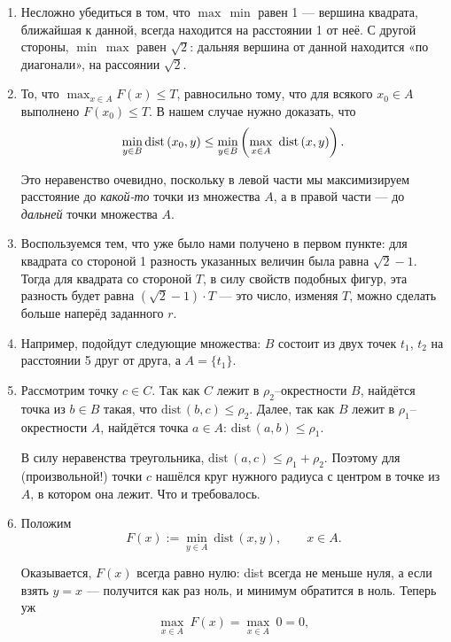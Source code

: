 \def\dist{\mathrm{dist}\,} \def\l#1{\limits_{#1}}
\def\Dist{\mathrm{DIST}\,}

\begin{enumerate}

\item Несложно убедиться в том, что $\max\,\min$ равен 1 — вершина квадрата, ближайшая к данной, всегда находится на расстоянии 1 от неё. С другой стороны, $\min\,\max$ равен $\sqrt{2}$: дальняя вершина от данной находится «по диагонали», на рассоянии $\sqrt{2}$.

\item То, что $\max_{x \in A} F(x) \le T$, равносильно тому, что для всякого $x_0 \in A$ выполнено $F(x_0) \le T$. В нашем случае нужно доказать, что
$$\min\l{y \in B} \dist(x_0,y) \le \min\l{y \in B}
	\ll \max\l{x \in A}\ \dist (x,y) \rr.$$

Это неравенство очевидно, поскольку в левой части мы максимизируем расстояние до {\itshape какой-то} точки из множества $A$, а в правой части — до {\itshape дальней} точки множества $A$.

\item Воспользуемся тем, что уже было нами получено в первом пункте: для квадрата со стороной 1 разность указанных величин была равна $\sqrt 2 -1$. Тогда для квадрата со стороной $T$, в силу свойств подобных фигур, эта разность будет равна $(\sqrt 2 -1) \cdot T$ — это число, изменяя $T$, можно сделать больше наперёд заданного $r$.

\item Например, подойдут следующие множества: $B$ состоит из двух точек $t_1$, $t_2$ на расстоянии 5 друг от друга, а $A = \{ t_1 \}$.

\item Рассмотрим точку $c \in C$. Так как $C$ лежит в $\rho_2$–окрестности $B$, найдётся точка из $b \in B$ такая, что $\dist (b,c) \le \rho_2$. Далее, так как $B$ \linebreak  лежит в $\rho_1$--окрестности $A$, найдётся точка $a \in A$: $\dist (a,b) \le \rho_1$.

В силу неравенства треугольника, $\dist (a,c) \le \rho_1 + \rho_2$. Поэтому для (произвольной!) точки $c$ нашёлся круг нужного радиуса с центром в точке из $A$, в котором она лежит. Что и требовалось.

\item Положим
$$F(x) := \min\l{y \in A}\ \dist (x,y), \qquad x \in A.$$

Оказывается, $F(x)$ всегда равно нулю: dist всегда не меньше нуля, а если взять $y=x$ — получится как раз ноль, и минимум обратится в ноль. Теперь уж
$$\max\l{x\in A}\ F(x) = \max\l{x \in A}\ 0 = 0,$$


\end{enumerate}
